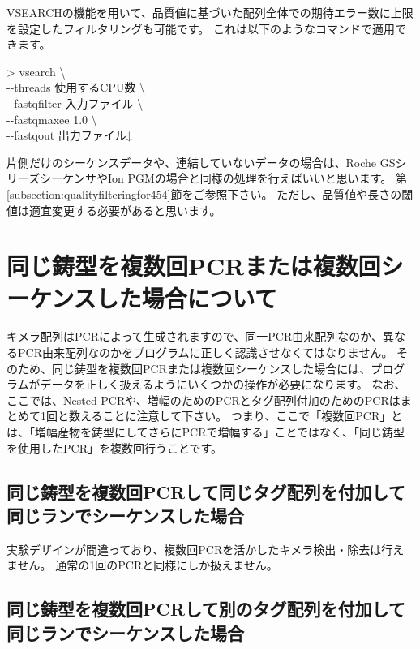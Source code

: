 \documentclass[titlepage,10pt,a4paper]{jsbook}
\newenvironment{cmd}{\begin{oframed}\raggedright\ttfamily\footnotesize\setlength{\baselineskip}{1.4em}}{\end{oframed}\vspace{-1em}}
\begin{document}
VSEARCHの機能を用いて、品質値に基づいた配列全体での期待エラー数に上限を設定したフィルタリングも可能です。
これは以下のようなコマンドで適用できます。

\begin{cmd}
{\textgreater} vsearch {\textbackslash}\\
{-}{-}threads 使用するCPU数 {\textbackslash}\\
{-}{-}fastq{\textunderscore}filter 入力ファイル {\textbackslash}\\
{-}{-}fastq{\textunderscore}maxee 1.0 {\textbackslash}\\
{-}{-}fastqout 出力ファイル↓
\end{cmd}

片側だけのシーケンスデータや、連結していないデータの場合は、Roche GSシリーズシーケンサやIon PGMの場合と同様の処理を行えばいいと思います。
第\ref{subsection:qualityfilteringfor454}節をご参照下さい。
ただし、品質値や長さの閾値は適宜変更する必要があると思います。

\section{同じ鋳型を複数回PCRまたは複数回シーケンスした場合について}

キメラ配列はPCRによって生成されますので、同一PCR由来配列なのか、異なるPCR由来配列なのかをプログラムに正しく認識させなくてはなりません。
そのため、同じ鋳型を複数回PCRまたは複数回シーケンスした場合には、プログラムがデータを正しく扱えるようにいくつかの操作が必要になります。
なお、ここでは、Nested PCRや、増幅のためのPCRとタグ配列付加のためのPCRはまとめて1回と数えることに注意して下さい。
つまり、ここで「複数回PCR」とは、「増幅産物を鋳型にしてさらにPCRで増幅する」ことではなく、「同じ鋳型を使用したPCR」を複数回行うことです。

\subsection{同じ鋳型を複数回PCRして同じタグ配列を付加して同じランでシーケンスした場合}

実験デザインが間違っており、複数回PCRを活かしたキメラ検出・除去は行えません。
通常の1回のPCRと同様にしか扱えません。

\subsection{同じ鋳型を複数回PCRして別のタグ配列を付加して同じランでシーケンスした場合}
\end{document}
